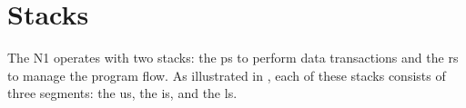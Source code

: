 
\section{Stacks}
\label{stacks}

The N1 operates with two stacks: the \gls{ps} to perform data transactions and the
\gls{rs} to manage the program flow. As illustrated in , each of
these stacks consists of three segments: the \gls{us}, the \gls{is}, and the \gls{ls}.

